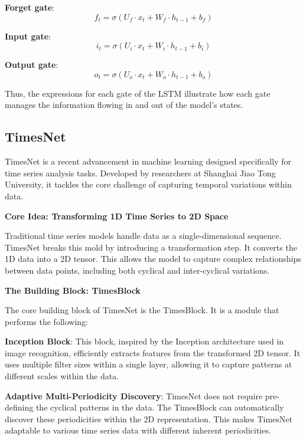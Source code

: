 \documentclass{ieeeojies}
\begin{document}
\noindent \textbullet \textbf{ Forget gate}:
\[
f_t = \sigma(U_f \cdot x_t + W_f \cdot h_{t-1} + b_f)
\]

\noindent \textbullet \textbf{ Input gate}:
\[
i_t = \sigma(U_i \cdot x_t + W_i \cdot h_{t-1} + b_i)
\]

\noindent \textbullet \textbf{ Output gate}:
\[
o_t = \sigma(U_o \cdot x_t + W_o \cdot h_{t-1} + b_o)
\]

Thus, the expressions for each gate of the LSTM illustrate how each gate manages the information flowing in and out of the model's states.


  \subsection{TimesNet}
  TimesNet is a recent advancement in machine learning designed specifically for time series analysis tasks. Developed by researchers at Shanghai Jiao Tong University, it tackles the core challenge of capturing temporal variations within data.

  \textbf{Core Idea: Transforming 1D Time Series to 2D Space}

  \noindent
  Traditional time series models handle data as a single-dimensional sequence. TimesNet breaks this mold by introducing a transformation step. It converts the 1D data into a 2D tensor. This allows the model to capture complex relationships between data points, including both cyclical and inter-cyclical variations.
  
  \textbf{The Building Block: TimesBlock}

  \noindent
  The core building block of TimesNet is the TimesBlock. It is a module that performs the following:

  \textbf{Inception Block}: This block, inspired by the Inception architecture used in image recognition, efficiently extracts features from the transformed 2D tensor. It uses multiple filter sizes within a single layer, allowing it to capture patterns at different scales within the data.

  \indent
  \textbf{Adaptive Multi-Periodicity Discovery}: TimesNet does not require pre-defining the cyclical patterns in the data. The TimesBlock can automatically discover these periodicities within the 2D representation. This makes TimesNet adaptable to various time series data with different inherent periodicities.
\end{document}
